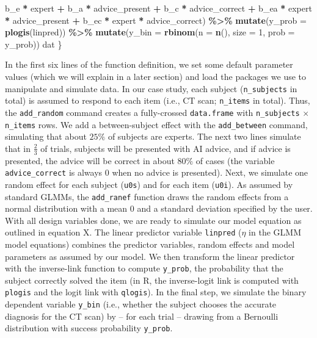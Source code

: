 \documentclass[
  man,floatsintext]{apa6}
\newenvironment{Shaded}{\begin{snugshade}}{\end{snugshade}}
\newcommand{\AttributeTok}[1]{\textcolor[rgb]{0.13,0.29,0.53}{#1}}
\newcommand{\DecValTok}[1]{\textcolor[rgb]{0.00,0.00,0.81}{#1}}
\newcommand{\FunctionTok}[1]{\textcolor[rgb]{0.13,0.29,0.53}{\textbf{#1}}}
\newcommand{\NormalTok}[1]{#1}
\newcommand{\SpecialCharTok}[1]{\textcolor[rgb]{0.81,0.36,0.00}{\textbf{#1}}}
\begin{document}
\begin{Shaded}
\begin{Highlighting}[]
\NormalTok{        b\_e }\SpecialCharTok{*}\NormalTok{ expert }\SpecialCharTok{+}\NormalTok{ b\_a }\SpecialCharTok{*}\NormalTok{ advice\_present }\SpecialCharTok{+}\NormalTok{ b\_c }\SpecialCharTok{*}\NormalTok{ advice\_correct }\SpecialCharTok{+}
\NormalTok{        b\_ea }\SpecialCharTok{*}\NormalTok{ expert }\SpecialCharTok{*}\NormalTok{ advice\_present }\SpecialCharTok{+}\NormalTok{ b\_ec }\SpecialCharTok{*}\NormalTok{ expert }\SpecialCharTok{*}\NormalTok{ advice\_correct) }\SpecialCharTok{\%\textgreater{}\%}
    \FunctionTok{mutate}\NormalTok{(}\AttributeTok{y\_prob =} \FunctionTok{plogis}\NormalTok{(linpred)) }\SpecialCharTok{\%\textgreater{}\%}
    \FunctionTok{mutate}\NormalTok{(}\AttributeTok{y\_bin =} \FunctionTok{rbinom}\NormalTok{(}\AttributeTok{n =} \FunctionTok{n}\NormalTok{(), }\AttributeTok{size =} \DecValTok{1}\NormalTok{, }\AttributeTok{prob =}\NormalTok{ y\_prob))}
\NormalTok{  dat}
\NormalTok{\}}
\end{Highlighting}
\end{Shaded}

In the first six lines of the function definition, we set some default parameter values (which we will explain in a later section) and load the packages we use to manipulate and simulate data.
In our case study, each subject (\texttt{n\_subjects} in total) is assumed to respond to each item (i.e., CT scan; \texttt{n\_items} in total). Thus, the \texttt{add\_random} command creates a fully-crossed \texttt{data.frame} with \texttt{n\_subjects} \(\times\) \texttt{n\_items} rows. We add a between-subject effect with the \texttt{add\_between} command, simulating that about \(25\%\) of subjects are experts. The next two lines simulate that in \(\frac{2}{3}\) of trials, subjects will be presented with AI advice, and if advice is presented, the advice will be correct in about \(80\%\) of cases (the variable \texttt{advice\_correct} is always 0 when no advice is presented). Next, we simulate one random effect for each subject (\texttt{u0s}) and for each item (\texttt{u0i}). As assumed by standard GLMMs, the \texttt{add\_ranef} function draws the random effects from a normal distribution with a mean 0 and a standard deviation specified by the user. With all design variables done, we are ready to simulate our model equation as outlined in equation X. The linear predictor variable \texttt{linpred} (\(\eta\) in the GLMM model equations) combines the predictor variables, random effects and model parameters as assumed by our model. We then transform the linear predictor with the inverse-link function to compute \texttt{y\_prob}, the probability that the subject correctly solved the item (in R, the inverse-logit link is computed with \texttt{plogis} and the logit link with \texttt{qlogis}). In the final step, we simulate the binary dependent variable \texttt{y\_bin} (i.e., whether the subject chooses the accurate diagnosis for the CT scan) by -- for each trial -- drawing from a Bernoulli distribution with success probability \texttt{y\_prob}.
\end{document}
